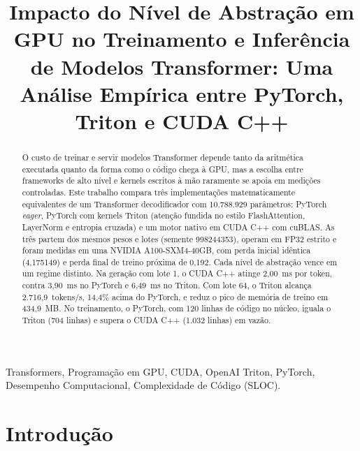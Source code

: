 \documentclass[conference]{IEEEtran}
\begin{document}
\balance

\title{Impacto do Nível de Abstração em GPU no Treinamento e Inferência de Modelos Transformer: Uma Análise Empírica entre PyTorch, Triton e CUDA C++}

\author{
}

\renewcommand{\IEEEkeywordsname}{Palavras-chave}
\maketitle

\begin{abstract}
O custo de treinar e servir modelos Transformer depende tanto da aritmética executada quanto da forma como o código chega à GPU, mas a escolha entre frameworks de alto nível e kernels escritos à mão raramente se apoia em medições controladas. Este trabalho compara três implementações matematicamente equivalentes de um Transformer decodificador com 10.788.929 parâmetros: PyTorch \textit{eager}, PyTorch com kernels Triton (atenção fundida no estilo FlashAttention, LayerNorm e entropia cruzada) e um motor nativo em CUDA C++ com cuBLAS. As três partem dos mesmos pesos e lotes (semente 998244353), operam em FP32 estrito e foram medidas em uma NVIDIA A100-SXM4-40GB, com perda inicial idêntica (4,175149) e perda final de treino próxima de 0,192. Cada nível de abstração vence em um regime distinto. Na geração com lote 1, o CUDA C++ atinge 2,00~ms por token, contra 3,90~ms no PyTorch e 6,49~ms no Triton. Com lote 64, o Triton alcança 2.716,9~tokens/s, 14,4\% acima do PyTorch, e reduz o pico de memória de treino em 434,9~MB. No treinamento, o PyTorch, com 120 linhas de código no núcleo, iguala o Triton (704 linhas) e supera o CUDA C++ (1.032 linhas) em vazão.
\end{abstract}

\begin{IEEEkeywords}
Transformers, Programação em GPU, CUDA, OpenAI Triton, PyTorch, Desempenho Computacional, Complexidade de Código (SLOC).
\end{IEEEkeywords}

\section{Introdução}
\label{sec:introducao}
\end{document}
